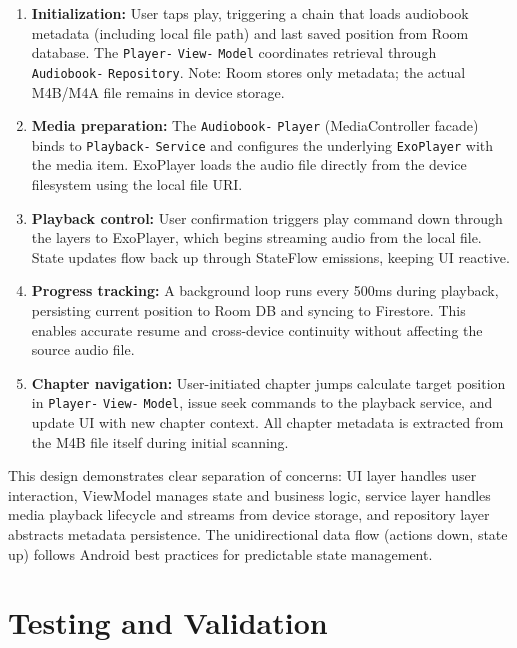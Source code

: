\documentclass[11pt,a4paper]{article}
\begin{document}
\begin{enumerate}[noitemsep]
    \item \textbf{Initialization:} User taps play, triggering a chain that loads audiobook metadata (including local file path) and last saved position from Room database. The \texttt{Player-} \texttt{View-} \texttt{Model} coordinates retrieval through \texttt{Audiobook-} \texttt{Repository}. Note: Room stores only metadata; the actual M4B/M4A file remains in device storage.

    \item \textbf{Media preparation:} The \texttt{Audiobook-} \texttt{Player} (MediaController facade) binds to \texttt{Playback-} \texttt{Service} and configures the underlying \texttt{ExoPlayer} with the media item. ExoPlayer loads the audio file directly from the device filesystem using the local file URI.

    \item \textbf{Playback control:} User confirmation triggers play command down through the layers to ExoPlayer, which begins streaming audio from the local file. State updates flow back up through StateFlow emissions, keeping UI reactive.

    \item \textbf{Progress tracking:} A background loop runs every 500ms during playback, persisting current position to Room DB and syncing to Firestore. This enables accurate resume and cross-device continuity without affecting the source audio file.

    \item \textbf{Chapter navigation:} User-initiated chapter jumps calculate target position in \texttt{Player-} \texttt{View-} \texttt{Model}, issue seek commands to the playback service, and update UI with new chapter context. All chapter metadata is extracted from the M4B file itself during initial scanning.
\end{enumerate}

This design demonstrates clear separation of concerns: UI layer handles user interaction, ViewModel manages state and business logic, service layer handles media playback lifecycle and streams from device storage, and repository layer abstracts metadata persistence. The unidirectional data flow (actions down, state up) follows Android best practices for predictable state management.

\section{Testing and Validation}
\end{document}
